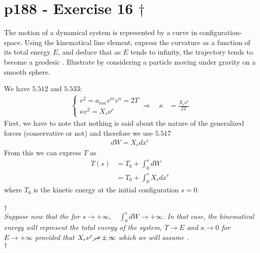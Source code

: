 \section{p188 - Exercise 16 $\dagger$}
\begin{tcolorbox}
The motion of a dynamical system is represented by a curve in configuration-space. Using the kinematical line element, express the curvature as a function of its total energy $E$, and deduce that as $E$ tends to infinity, the trajectory tends to become a geodesic . Illustrate by considering a particle moving under gravity on a smooth sphere.
\end{tcolorbox} 
We have $\mathbf{5.512}$ and $\mathbf{5.533}$:
\begin{align}
\left\{\begin{array}{l}
v^2= a_{mn}v^mv^n= 2T\\
\kappa v^2 = X_r\nu^r
\end{array}\right.
\Rightarrow \quad \kappa &= \frac{X_r\nu^r}{2T}
\end{align}
First, we have to note that nothing is said about the nature of the generalized forces (conservative or not) and therefore we use $\mathbf{5.517}$
\begin{align}
dW = X_r dx^r
\end{align}
From this we can express $T$ as
\begin{align}
T\left(s\right) &= T_0 + \int_{0}^{s}dW\\
&= T_0 + \int_{0}^{s}X_r dx^r
\end{align}
where $T_0$ is the kinetic energy at the initial configuration $s=0$.\\\\
$\mathbf{\dagger}$\\ \textit{Suppose now that the for $ s\rightarrow +\infty, \quad \int_{0}^{s}dW\rightarrow +\infty$. In that case, the kinematical energy will represent the total energy of the system, $T\rightarrow E$ and $\kappa \rightarrow 0$ for $E\rightarrow +\infty$ provided that $X_r\nu^r\cancel{\rightarrow}\pm \infty$ which we will assume . }\\$\mathbf{\dagger}$
\begin{comment}
Consider $\mathbf{5.535}\quad dW=X ds\cos \phi$ where $X$ is the magnitude of the generalized force and $\phi$ the angle between the line of force and the trajectory. Suppose that $X\rightarrow \pm \infty$. In order to still have $\mathbf{5.535}$ an infinitesimal expression we need that $\cos\phi \rightarrow 0$ , which means that the generalized force is perpendicular to the tangent of the trajectory. This would mean that from $(1)$, $\kappa$ would be indefinite, unless $X_r\nu^r< 2T$.
\end{comment}
